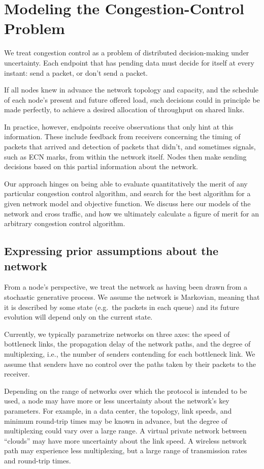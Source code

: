 \section{Modeling the Congestion-Control Problem}
\label{s:model}

We treat congestion control as a problem of distributed
decision-making under uncertainty. Each endpoint that has pending data
must decide for itself at every instant: send a packet, or don't
send a packet.

If all nodes knew in advance the network topology and capacity, and the
schedule of each node's present and future offered load, such
decisions could in principle be made perfectly, to achieve a desired
allocation of throughput on shared links.

In practice, however, endpoints receive observations that only hint at
this information. These include feedback from receivers concerning the
timing of packets that arrived and detection of packets that didn't, and
sometimes signals, such as ECN marks, from within the network itself.
Nodes then make sending decisions based on this partial information
about the network.

Our approach hinges on being able to evaluate quantitatively the merit
of any particular congestion control algorithm, and search for the
best algorithm for a given network model and objective function. We
discuss here our models of the network and cross traffic, and how we
ultimately calculate a figure of merit for an arbitrary congestion
control algorithm.

\subsection{Expressing prior assumptions about the network}

From a node's perspective, we treat the network as having been drawn
from a stochastic generative process. We assume the network is
Markovian, meaning that it is described by some state (e.g.~the
packets in each queue) and its future evolution will depend only on
the current state.

Currently, we typically parametrize networks on three axes: the speed
of bottleneck links, the propagation delay of the network paths, and
the degree of multiplexing, i.e., the number of senders contending for
each bottleneck link. We assume that senders have no control over the
paths taken by their packets to the receiver.

Depending on the range of networks over which the protocol is intended
to be used, a node may have more or less uncertainty about the
network's key parameters. For example, in a data center, the topology,
link speeds, and minimum round-trip times may be known in advance, but
the degree of multiplexing could vary over a large range. A virtual
private network between ``clouds'' may have more uncertainty about the
link speed. A wireless network path may experience less multiplexing,
but a large range of transmission rates and round-trip times.

